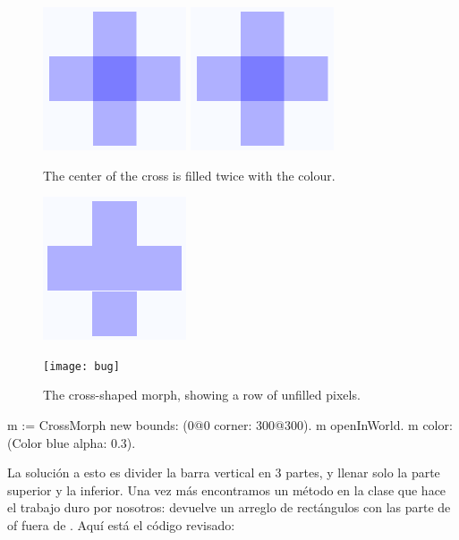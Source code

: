 \documentclass[a4paper,10pt,twoside]{book}
\begin{document}
\begin{figure}[t]
\begin{minipage}{0.48\textwidth}
	\ifluluelse
		{\centerline{\includegraphics[scale=0.6]{overdrawBug}}}
		{\centerline{\includegraphics{overdrawBug}}}
	\caption{The center of the cross is filled twice with the colour.
		}
\end{minipage}
\hfill
\begin{minipage}{0.48\textwidth}
	\ifluluelse
		{\centerline{\includegraphics[scale=0.6]{hairlineBug}}}
		{\centerline{\texttt{[image: bug]}}}
	\caption{The cross-shaped morph, showing a row of unfilled pixels.
		}
\end{minipage}
\end{figure}


\begin{code}{}
m := CrossMorph new bounds: (0@0 corner: 300@300).
m openInWorld.
m color: (Color blue alpha: 0.3).
\end{code}

\noindent
La soluci\'on a esto es divider la barra vertical en 3 partes, y llenar solo la parte superior y la inferior.
Una vez m\'as encontramos un m\'etodo en la clase   que hace el trabajo duro por nosotros:  devuelve un arreglo de rect\'angulos con las parte de of  fuera de . 
Aqu\'i est\'a el c\'odigo revisado:
\end{document}
